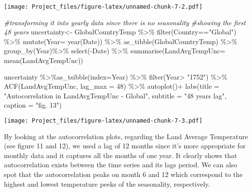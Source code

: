\documentclass[
]{article}
\newenvironment{Shaded}{\begin{snugshade}}{\end{snugshade}}
\newcommand{\AttributeTok}[1]{\textcolor[rgb]{0.77,0.63,0.00}{#1}}
\newcommand{\CommentTok}[1]{\textcolor[rgb]{0.56,0.35,0.01}{\textit{#1}}}
\newcommand{\DecValTok}[1]{\textcolor[rgb]{0.00,0.00,0.81}{#1}}
\newcommand{\FunctionTok}[1]{\textcolor[rgb]{0.00,0.00,0.00}{#1}}
\newcommand{\NormalTok}[1]{#1}
\newcommand{\OtherTok}[1]{\textcolor[rgb]{0.56,0.35,0.01}{#1}}
\newcommand{\SpecialCharTok}[1]{\textcolor[rgb]{0.00,0.00,0.00}{#1}}
\newcommand{\StringTok}[1]{\textcolor[rgb]{0.31,0.60,0.02}{#1}}
\begin{document}
\texttt{[image: Project\_files/figure-latex/unnamed-chunk-7-2.pdf]}

\begin{Shaded}
\begin{Highlighting}[]
\CommentTok{\#transforming it into yearly data since there is no seasonality}
\CommentTok{\#showing the first 48 years}
\NormalTok{uncertainty}\OtherTok{\textless{}{-}}\NormalTok{ GlobalCountryTemp }\SpecialCharTok{\%\textgreater{}\%} \FunctionTok{filter}\NormalTok{(Country}\SpecialCharTok{==}\StringTok{"Global"}\NormalTok{) }\SpecialCharTok{\%\textgreater{}\%}
  \FunctionTok{mutate}\NormalTok{(}\AttributeTok{Year=} \FunctionTok{year}\NormalTok{(Date)) }\SpecialCharTok{\%\textgreater{}\%} 
  \FunctionTok{as\_tibble}\NormalTok{(GlobalCountryTemp) }\SpecialCharTok{\%\textgreater{}\%} 
  \FunctionTok{group\_by}\NormalTok{(Year)}\SpecialCharTok{\%\textgreater{}\%}
  \FunctionTok{select}\NormalTok{(}\SpecialCharTok{{-}}\NormalTok{Date) }\SpecialCharTok{\%\textgreater{}\%}
  \FunctionTok{summarise}\NormalTok{(}\AttributeTok{LandAvgTempUnc=} \FunctionTok{mean}\NormalTok{(LandAvgTempUnc))}

\NormalTok{uncertainty }\SpecialCharTok{\%\textgreater{}\%}\FunctionTok{as\_tsibble}\NormalTok{(}\AttributeTok{index=}\NormalTok{Year) }\SpecialCharTok{\%\textgreater{}\%} \FunctionTok{filter}\NormalTok{(Year}\SpecialCharTok{\textgreater{}} \StringTok{"1752"}\NormalTok{) }\SpecialCharTok{\%\textgreater{}\%} 
  \FunctionTok{ACF}\NormalTok{(LandAvgTempUnc, }\AttributeTok{lag\_max =} \DecValTok{48}\NormalTok{) }\SpecialCharTok{\%\textgreater{}\%} \FunctionTok{autoplot}\NormalTok{()}\SpecialCharTok{+}
  \FunctionTok{labs}\NormalTok{(}\AttributeTok{title =} \StringTok{"Autocorrelation in LandAvgTempUnc {-} Global"}\NormalTok{,}
       \AttributeTok{subtitle =} \StringTok{"48 years lag"}\NormalTok{,}
       \AttributeTok{caption =} \StringTok{"fig. 13"}\NormalTok{)}
\end{Highlighting}
\end{Shaded}

\texttt{[image: Project\_files/figure-latex/unnamed-chunk-7-3.pdf]}

By looking at the autocorrelation plots, regarding the Land Average
Temperature (see figure 11 and 12), we used a lag of 12 months since
it's more appropriate for monthly data and it captures all the months of
one year. It clearly shows that autocorrelation exists between the time
series and its lags period. We can also spot that the autocorrelation
peaks on month 6 and 12 which correspond to the highest and lowest
temperature peeks of the seasonality, respectively.
\end{document}

